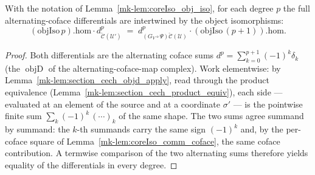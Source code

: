 \begin{lemma}
  \label{mk-lem:coreIso_comm_sum}

  With the notation of Lemma~\ref{mk-lem:coreIso_obj_iso}, for each degree \(p\) the full
  alternating-coface differentials are intertwined by the object isomorphisms:
  \[
    (\mathrm{objIso}\,p).\mathrm{hom} \cdot d^p_{\check{\mathcal{C}}(\mathcal{U}')}
      \;=\;
    d^p_{(G_V\circ\Psi)\check{\mathcal{C}}(\mathcal{U})} \cdot (\mathrm{objIso}\,(p+1)).\mathrm{hom}.
  \]
\end{lemma}
\begin{proof}
  Both differentials are the alternating coface sums \(d^p = \sum_{k=0}^{p+1} (-1)^k
  \delta_k\) (the \(\operatorname{objD}\) of the alternating-coface-map complex). Work
  elementwise: by Lemma~\ref{mk-lem:section_cech_objd_apply}, read through the product equivalence
  (Lemma~\ref{mk-lem:section_cech_product_equiv}), each side — evaluated at an element of the source
  and at a coordinate \(\sigma'\) — is the pointwise finite sum \(\sum_{k} (-1)^k\,(\cdots)_k\) of
  the same shape. The two sums agree summand by summand: the \(k\)-th summands carry the same sign
  \((-1)^k\) and, by the per-coface square of Lemma~\ref{mk-lem:coreIso_comm_coface}, the same coface
  contribution. A termwise comparison of the two alternating sums therefore yields equality of
  the differentials in every degree.
\end{proof}

